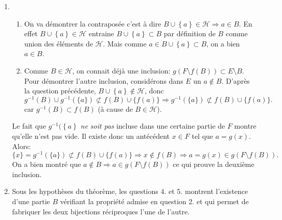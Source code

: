 \begin{enumerate}
  \item 
\begin{enumerate}
  \item On va démontrer la contraposée c'est à dire $B \cup \left\lbrace a\right\rbrace \in \mathcal{H} \Rightarrow a \in B$.\newline
En effet $B \cup \left\lbrace a\right\rbrace \in \mathcal{H}$ entraine $B \cup \left\lbrace a\right\rbrace \subset B$ par définition de $B$ comme union des éléments de $\mathcal{H}$. Mais comme $a\in B\cup \left\lbrace a\right\rbrace \subset B$, on a bien $a\in B$.
  \item Comme $B\in \mathcal{H}$, on connait déjà une inclusion: $g(F\setminus f(B)) \subset E \setminus B$.\newline
Pour démontrer l'autre inclusion, considérons dans $E$ un $a\notin B$.\newline
D'après la question précédente, $B \cup \left\lbrace a\right\rbrace \notin \mathcal{H}$, donc
\begin{displaymath}
  g^{-1}(B)\cup g^{-1}(\{a\}) \not\subset f(B)\cup \{f(a)\}
\Rightarrow g^{-1}(\{a\}) \not\subset f(B)\cup \{f(a)\}.
\end{displaymath}
car $g^{-1}(B)\subset f(B)$ (à cause de $B\in \mathcal{H}$).
\end{enumerate}
Le fait que $g^{-1}(\left\lbrace a\right\rbrace$ \emph{ne soit pas} incluse dans une certaine partie de $F$ montre qu'elle n'est pas vide. Il existe donc un antécédent $x\in F$ tel que $a=g(x)$. Alors:
\begin{displaymath}
  \{x\} = g^{-1}(\{a\}) \not\subset f(B)\cup \{f(a)\} \Rightarrow x \notin f(B) \Rightarrow a=g(x)\in g(F\setminus f(B)).
\end{displaymath}
On a bien montré que $a\notin B \Rightarrow a\in g(F\setminus f(B))$ ce qui prouve la deuxième inclusion.

\item Sous les hypothèses du théorème, les questions 4. et 5. montrent l'existence d'une partie $B$ vérifiant la propriété admise en question 2. et qui permet de fabriquer les deux bijections réciproques l'une de l'autre.
\end{enumerate}
